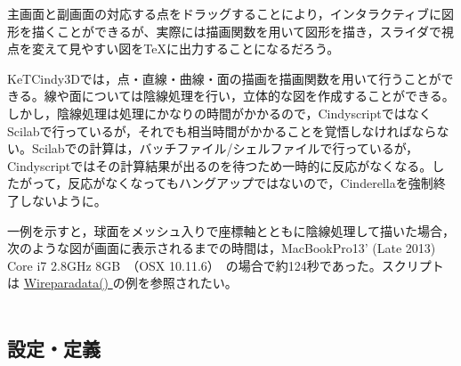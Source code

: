\documentclass[papersize,a4paper,12pt,uplatex]{jsarticle}
\begin{document}
主画面と副画面の対応する点をドラッグすることにより，インタラクティブに図形を描くことができるが、実際には描画関数を用いて図形を描き，スライダで視点を変えて見やすい図をTeXに出力することになるだろう。

KeTCindy3Dでは，点・直線・曲線・面の描画を描画関数を用いて行うことができる。線や面については陰線処理を行い，立体的な図を作成することができる。しかし，陰線処理は処理にかなりの時間がかかるので，CindyscriptではなくScilabで行っているが，それでも相当時間がかかることを覚悟しなければならない。Scilabでの計算は，バッチファイル/シェルファイルで行っているが，Cindyscriptではその計算結果が出るのを待つため一時的に反応がなくなる。したがって，反応がなくなってもハングアップではないので，Cinderellaを強制終了しないように。

一例を示すと，球面をメッシュ入りで座標軸とともに陰線処理して描いた場合，次のような図が画面に表示されるまでの時間は，MacBookPro13' (Late 2013) Core i7 2.8GHz 8GB　（OSX 10.11.6）　の場合で約124秒であった。スクリプトは \hyperlink{wireparadata}{Wireparadata() } の例を参照されたい。\\
　　　　　　　　　　　　　

\newpage
\subsection{設定・定義}
\end{document}
